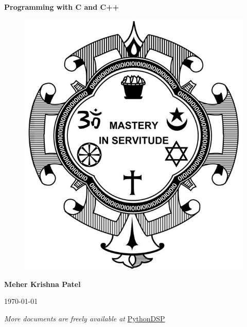 \begin{titlepage}	
	\centering
	
	\vspace*{40mm} %
	\textbf{\Huge {Programming with C and C++}}
	
	\vspace{0mm}
	\begin{figure}[!h]
		\centering
		\includegraphics[scale=0.3]{title-page/logo.jpg}
	\end{figure}
	
	\vspace{0mm} 
	\Large \textbf{{Meher Krishna Patel}}
	
	\small 	\today
	
	
	\vfill
	\small \textit{More documents are freely available at }{\href{http://pythondsp.readthedocs.io/en/latest/pythondsp/toc.html}{PythonDSP}}	
\end{titlepage}

